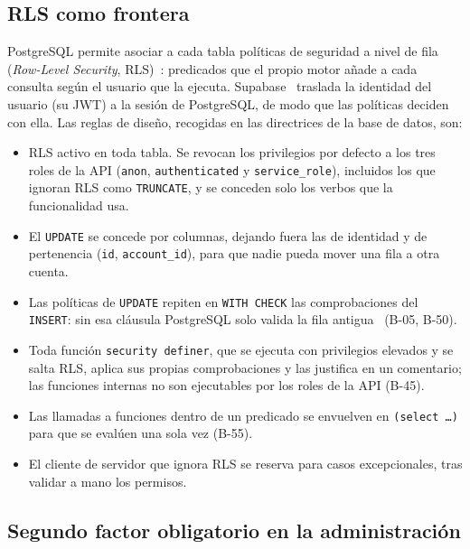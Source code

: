 \subsection{RLS como frontera}
\label{sec:dis-rls}

PostgreSQL permite asociar a cada tabla políticas de seguridad a nivel de
fila (\textit{Row-Level Security}, RLS)~\cite{postgresql-rls}: predicados que
el propio motor añade a cada consulta según el usuario que la ejecuta.
Supabase~\cite{supabase-rls} traslada la identidad del usuario (su JWT) a la
sesión de PostgreSQL, de modo que las políticas deciden con ella. Las reglas
de diseño, recogidas en las directrices de la base de datos, son:

\begin{itemize}
  \item RLS activo en toda tabla. Se revocan los privilegios por defecto a
        los tres roles de la API (\texttt{anon}, \texttt{authenticated} y
        \texttt{service\_role}), incluidos los que ignoran RLS como
        \texttt{TRUNCATE}, y se conceden solo los verbos que la funcionalidad
        usa.
  \item El \texttt{UPDATE} se concede por columnas, dejando fuera las de
        identidad y de pertenencia (\texttt{id}, \texttt{account\_id}), para
        que nadie pueda mover una fila a otra cuenta.
  \item Las políticas de \texttt{UPDATE} repiten en \texttt{WITH CHECK} las
        comprobaciones del \texttt{INSERT}: sin esa cláusula PostgreSQL solo
        valida la fila antigua~\cite{postgresql-createpolicy} (B-05, B-50).
  \item Toda función \texttt{security definer}, que se ejecuta con
        privilegios elevados y se salta RLS, aplica sus propias
        comprobaciones y las justifica en un comentario; las funciones
        internas no son ejecutables por los roles de la API (B-45).
  \item Las llamadas a funciones dentro de un predicado se envuelven en
        \texttt{(select \ldots)} para que se evalúen una sola vez (B-55).
  \item El cliente de servidor que ignora RLS se reserva para casos
        excepcionales, tras validar a mano los permisos.
\end{itemize}

\subsection{Segundo factor obligatorio en la administración}
\label{sec:dis-mfa}

